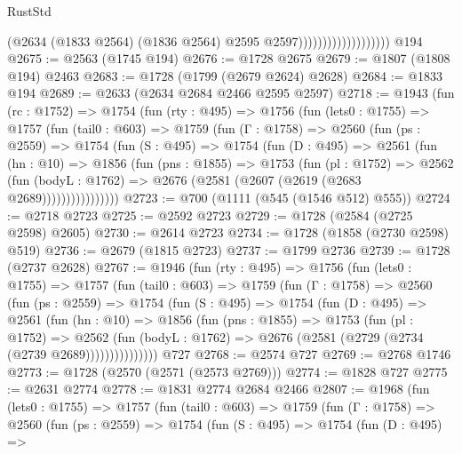 \begin{lexlean}{RustStd}
\begin{coremodule}
                                        (@2634
                                          (@1833 @2564)
                                          (@1836 @2564)
                                          @2595
                                          @2597)))))))))))))))))))
    @194
@2675 := @2563 (@1745 @194)
@2676 := @1728 @2675
@2679 := @1807 (@1808 @194) @2463
@2683 := @1728 (@1799 (@2679 @2624) @2628)
@2684 := @1833 @194
@2689 := @2633 (@2634 @2684 @2466 @2595 @2597)
@2718 := @1943
    (fun (rc : @1752) =>
    @1754
      (fun (rty : @495) =>
      @1756
        (fun (lets0 : @1755) =>
        @1757
          (fun (tail0 : @603) =>
          @1759
            (fun (Γ : @1758) =>
            @2560
              (fun (ps : @2559) =>
              @1754
                (fun (S : @495) =>
                @1754
                  (fun (D : @495) =>
                  @2561
                    (fun (hn : @10) =>
                    @1856
                      (fun (pns : @1855) =>
                      @1753
                        (fun (pl : @1752) =>
                        @2562
                          (fun (bodyL : @1762) =>
                          @2676 (@2581 (@2607 (@2619 (@2683 @2689))))))))))))))))
@2723 := @700 (@1111 (@545 (@1546 @512) @555))
@2724 := @2718 @2723
@2725 := @2592 @2723
@2729 := @1728 (@2584 (@2725 @2598) @2605)
@2730 := @2614 @2723
@2734 := @1728 (@1858 (@2730 @2598) @519)
@2736 := @2679 (@1815 @2723)
@2737 := @1799 @2736
@2739 := @1728 (@2737 @2628)
@2767 := @1946
    (fun (rty : @495) =>
    @1756
      (fun (lets0 : @1755) =>
      @1757
        (fun (tail0 : @603) =>
        @1759
          (fun (Γ : @1758) =>
          @2560
            (fun (ps : @2559) =>
            @1754
              (fun (S : @495) =>
              @1754
                (fun (D : @495) =>
                @2561
                  (fun (hn : @10) =>
                  @1856
                    (fun (pns : @1855) =>
                    @1753
                      (fun (pl : @1752) =>
                      @2562
                        (fun (bodyL : @1762) =>
                        @2676 (@2581 (@2729 (@2734 (@2739 @2689)))))))))))))))
    @727
@2768 := @2574 @727
@2769 := @2768 @1746
@2773 := @1728 (@2570 (@2571 (@2573 @2769)))
@2774 := @1828 @727
@2775 := @2631 @2774
@2778 := @1831 @2774 @2684 @2466
@2807 := @1968
    (fun (lets0 : @1755) =>
    @1757
      (fun (tail0 : @603) =>
      @1759
        (fun (Γ : @1758) =>
        @2560
          (fun (ps : @2559) =>
          @1754
            (fun (S : @495) =>
            @1754
              (fun (D : @495) =>

\end{coremodule}
\end{lexlean}

